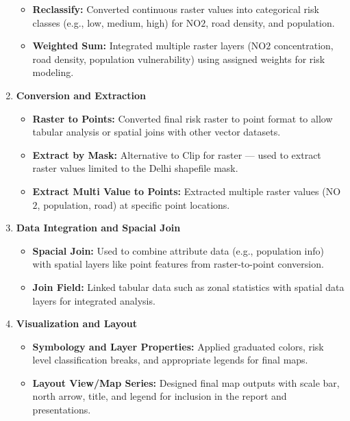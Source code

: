 \documentclass[12pt]{report}
\begin{document}
\begin{enumerate}
\begin{itemize}
        \item \textbf{Reclassify:} Converted continuous raster values into categorical risk classes (e.g., low, medium, high) for NO$2$, road density, and population.
        \item \textbf{Weighted Sum:} Integrated multiple raster layers (NO$2$ concentration, road density, population vulnerability) using assigned weights for risk modeling.
    \end{itemize}
    \item \textbf{Conversion and Extraction}
    \begin{itemize}
        \item \textbf{Raster to Points:} Converted final risk raster to point format to allow tabular analysis or spatial joins with other vector datasets.
        \item \textbf{Extract by Mask:} Alternative to Clip for raster — used to extract raster values limited to the Delhi shapefile mask.
        \item \textbf{Extract Multi Value to Points:} Extracted multiple raster values (NO$2$, population, road) at specific point locations.
    \end{itemize}
    \item \textbf{Data Integration and Spacial Join}
    \begin{itemize}
        \item \textbf{Spacial Join:} Used to combine attribute data (e.g., population info) with spatial layers like point features from raster-to-point conversion.
        \item \textbf{Join Field:} Linked tabular data such as zonal statistics with spatial data layers for integrated analysis.
    \end{itemize}
    \item \textbf{Visualization and Layout}
    \begin{itemize}
        \item \textbf{Symbology and Layer Properties:} Applied graduated colors, risk level classification breaks, and appropriate legends for final maps.
        \item \textbf{Layout View/Map Series:} Designed final map outputs with scale bar, north arrow, title, and legend for inclusion in the report and presentations.
    \end{itemize}
\end{enumerate}
\end{document}

